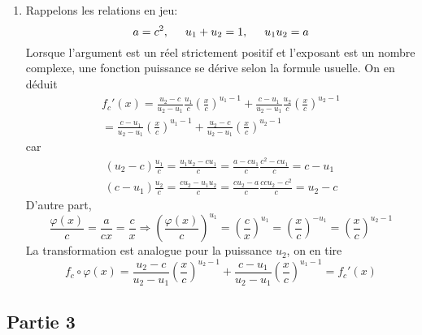\begin{enumerate}
\begin{enumerate}
\item Rappelons les relations en jeu:
\begin{displaymath}
  a = c^2,\hspace{0.5cm} u_1+u_2 = 1,\hspace{0.5cm}u_1u_2 = a
\end{displaymath}
Lorsque l'argument est un réel strictement positif et l'exposant est un nombre complexe, une fonction puissance se dérive selon la formule usuelle. On en déduit
\begin{multline*}
  f_c'(x)
= \frac{u_2-c}{u_2-u_1}\frac{u_1}{c}\left( \frac{x}{c}\right)^{u_1-1} 
 +\frac{c-u_1}{u_2-u_1}\frac{u_2}{c}\left( \frac{x}{c}\right)^{u_2-1} \\
= \frac{c-u_1}{u_2-u_1}\left( \frac{x}{c}\right)^{u_1-1} 
 +\frac{u_2 - c}{u_2-u_1}\left( \frac{x}{c}\right)^{u_2-1}
\end{multline*}
car
\begin{align*}
  (u_2-c)\frac{u_1}{c} = \frac{u_1u_2-cu_1}{c}=\frac{a-cu_1}{c}\frac{c^2-cu_1}{c}=c-u_1 \\
  (c-u_1)\frac{u_2}{c} = \frac{cu_2 - u_1u_2}{c}=\frac{cu_2-a}{c}\frac{ccu_2-c^2}{c}= u_2 - c
\end{align*}
D'autre part,
\begin{displaymath}
  \frac{\varphi(x)}{c} = \frac{a}{cx} = \frac{c}{x}
\Rightarrow
\left(\frac{\varphi(x)}{c} \right)^{u_1}  = \left(\frac{c}{x} \right)^{u_1} = \left(\frac{x}{c} \right)^{-u_1} 
= \left(\frac{x}{c} \right)^{u_2 -1}
\end{displaymath}
La transformation est analogue pour la puissance $u_2$, on en tire
\begin{displaymath}
f_c\circ \varphi(x)
=\frac{u_2-c}{u_2-u_1}\left(\frac{x}{c} \right)^{u_2 -1}
+\frac{c-u_1}{u_2-u_1}\left(\frac{x}{c} \right)^{u_1 -1} = f_c'(x)
\end{displaymath}

\end{enumerate}

\end{enumerate}

\subsection*{Partie 3}


